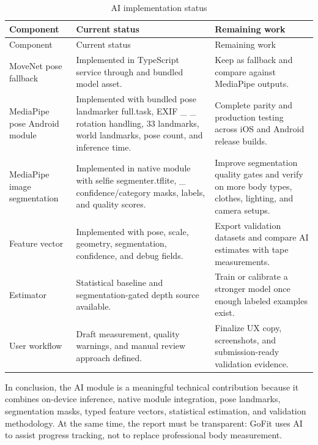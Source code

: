 \documentclass[12pt,a4paper,openany]{report}
\begin{document}
\begingroup
\footnotesize
\setlength{\tabcolsep}{3pt}
\renewcommand{\arraystretch}{1.20}
\setlength{\LTpre}{5pt}
\setlength{\LTpost}{10pt}
\begin{longtable}{|L{3.67cm}|L{5.29cm}|L{5.73cm}|}
\caption{AI implementation status}\label{tab:pdf-63-29} \\
\hline
{}
Component & Current status & Remaining work \\ \hline
\endfirsthead
\hline
{}
Component & Current status & Remaining work \\ \hline
\endhead
MoveNet pose fallback & Implemented in TypeScript service through  and bundled model asset. & Keep as fallback and compare against MediaPipe outputs. \\ \hline
MediaPipe pose Android module & Implemented with bundled pose landmarker full.task, EXIF \_ \_ rotation handling, 33 landmarks, world landmarks, pose count, and inference time. & Complete parity and production testing across iOS and Android release builds. \\ \hline
MediaPipe image segmentation & Implemented in native module with selfie segmenter.tflite, \_ confidence/category masks, labels, and quality scores. & Improve segmentation quality gates and verify on more body types, clothes, lighting, and camera setups. \\ \hline
Feature vector & Implemented with pose, scale, geometry, segmentation, confidence, and debug fields. & Export validation datasets and compare AI estimates with tape measurements. \\ \hline
Estimator & Statistical baseline and segmentation-gated depth source available. & Train or calibrate a stronger model once enough labeled examples exist. \\ \hline
User workflow & Draft measurement, quality warnings, and manual review approach defined. & Finalize UX copy, screenshots, and submission-ready validation evidence. \\ \hline
\end{longtable}
\endgroup

In conclusion, the AI module is a meaningful technical contribution because it combines on-device inference, native module integration, pose landmarks, segmentation masks, typed feature vectors, statistical estimation, and validation methodology. At the same time, the report must be transparent: GoFit uses AI to assist progress tracking, not to replace professional body measurement.
\end{document}
